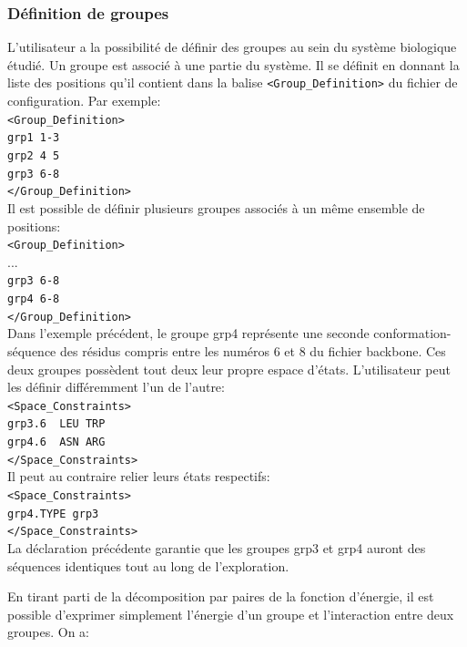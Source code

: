 \subsubsection{Définition de groupes}
\label{sub:group}
L'utilisateur a la possibilité de définir des groupes au sein du système biologique étudié. Un groupe est associé à une partie du système. Il se définit en donnant la liste des positions qu'il contient dans la balise \verb!<Group_Definition>! du fichier de configuration. Par exemple:\\
\verb!<Group_Definition>! \\
\verb!grp1 1-3! \\
\verb!grp2 4 5! \\
\verb!grp3 6-8! \\
\verb!</Group_Definition>! \\
Il est possible de définir plusieurs groupes associés à un même ensemble de positions:\\
\verb!<Group_Definition>! \\
... \\
\verb!grp3 6-8! \\
\verb!grp4 6-8! \\
\verb!</Group_Definition>! \\
Dans l'exemple précédent, le groupe grp4 représente une seconde conformation-séquence des résidus compris entre les numéros 6 et 8 du fichier backbone. Ces deux groupes possèdent tout deux leur propre espace d'états. L'utilisateur peut les définir différemment l'un de l'autre:\\
\verb!<Space_Constraints>! \\
\verb!grp3.6  LEU TRP! \\
\verb!grp4.6  ASN ARG!  \\
\verb!</Space_Constraints>! \\
Il peut au contraire relier leurs états respectifs:\\
\verb!<Space_Constraints>! \\
\verb!grp4.TYPE grp3! \\
\verb!</Space_Constraints>! \\
La déclaration précédente garantie que les groupes grp3 et grp4 auront des séquences identiques tout au long de l'exploration.

En tirant parti de la décomposition par paires de la fonction d'énergie, il est possible d'exprimer simplement l'énergie d'un groupe et l'interaction entre deux groupes. On a:

